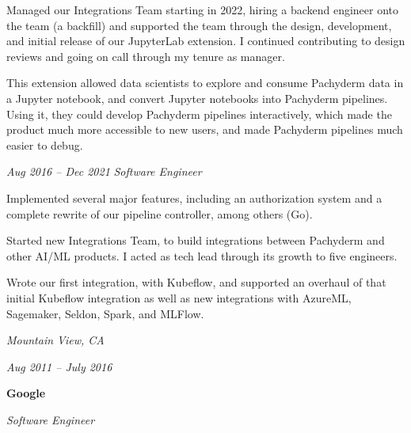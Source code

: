 \documentclass[10pt, letterpaper]{article}
\begin{document}
\vspace{0.1 cm}

\begin{onecolentry}
    \begin{highlights}
        \item Managed our Integrations Team starting in 2022, hiring a backend engineer onto the team (a backfill) and supported the team through the design, development, and initial release of our JupyterLab extension. I continued contributing to design reviews and going on call through my tenure as manager.
        \item This extension allowed data scientists to explore and consume Pachyderm data in a Jupyter notebook, and convert Jupyter notebooks into Pachyderm pipelines. Using it, they could develop Pachyderm pipelines interactively, which made the product much more accessible to new users, and made Pachyderm pipelines much easier to debug.
    \end{highlights}
\end{onecolentry}

\vspace{0.2 cm}

\begin{twocolentry}{
    \textit{Aug 2016 – Dec 2021}
}
    \textit{Software Engineer}
\end{twocolentry}

\vspace{0.1 cm}

\begin{onecolentry}
    \begin{highlights}
        \item Implemented several major features, including an authorization system and a complete rewrite of our pipeline controller, among others (Go).
        \item Started new Integrations Team, to build integrations between Pachyderm and other AI/ML products. I acted as tech lead through its growth to five engineers.
        \item Wrote our first integration, with Kubeflow, and supported an overhaul of that initial Kubeflow integration as well as new integrations with AzureML, Sagemaker, Seldon, Spark, and MLFlow.
    \end{highlights}
  \end{onecolentry}

\vspace{0.2 cm}

\begin{twocolentry}{
    \textit{Mountain View, CA}

    \textit{Aug 2011 – July 2016}
}
    \textbf{Google}

    \textit{Software Engineer}
\end{twocolentry}
\end{document}
